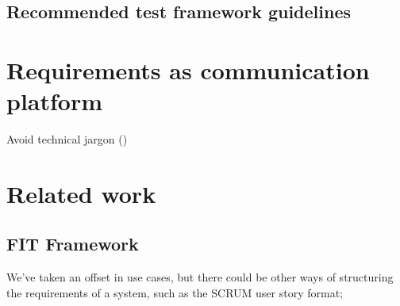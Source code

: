 \subsection{Recommended test framework guidelines}

\section{Requirements as communication platform}

Avoid technical jargon (\cite{christel1992issues})

\section{Related work}
\subsection{FIT Framework}

We've taken an offset in use cases, but there could be other ways of structuring the requirements of a system, such as the SCRUM user story format;



